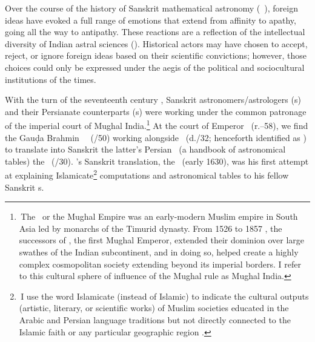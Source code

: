 \renewcommand{\thefootnote}{\arabic{footnote}} %

Over the course of the history of Sanskrit mathematical astronomy (\ganita\ \jyotisa), foreign ideas have evoked a full range of emotions that extend from affinity to apathy, going all the way to antipathy. These reactions are a reflection of the intellectual diversity of Indian astral sciences (\jyotihsastra). Historical actors may have chosen to accept, reject, or ignore foreign ideas based on their scientific convictions; however, those choices could only be expressed under the aegis of the political and sociocultural institutions of the times. 

With the turn of the seventeenth century \ce, Sanskrit astronomers/astrologers (\jyotisa s) and their Persianate counterparts (\munajjim s) were working under the common patronage of the imperial court of Mughal India.\footnote{\,The \GurkaniAlam\ or the Mughal Empire was an early-modern Muslim empire in South Asia led by monarchs of the Timurid dynasty. From 1526 to 1857 \ce, the successors of \Baburfull, the first Mughal Emperor, extended their dominion over large swathes of the Indian subcontinent, and in doing so, helped create a highly complex cosmopolitan society extending beyond its imperial borders. I refer to this cultural sphere of influence of the Mughal rule as Mughal India.} At the court of Emperor \Shahjahan\ (r.--58), we find the Gauḍa Brahmin \Pandita\ \Nityanandafull\ (/50) working alongside \MullaFaridfull\ (d.\thinspace {}/32; henceforth identified as \MullaFarid) to translate into Sanskrit the latter's Persian \zij\ (a handbook of astronomical tables) the  \ZijiShahJahani\ (/30). \Nityananda's Sanskrit translation, the \Siddhantasindhu\ (\circa early 1630), was his first attempt at explaining Islamicate\footnote{\,I use the word Islamicate (instead of Islamic) to indicate the cultural outputs (\eg artistic, literary, or scientific works) of Muslim societies educated in the Arabic and Persian language traditions but not directly connected to the Islamic faith or any particular geographic region \parencite[\vid\ recent discussions on Islamicate Secularities in][]{Dressleretal}.\label{islamicate_defintion}} computations and astronomical tables to his fellow Sanskrit \jyotisa s. 

